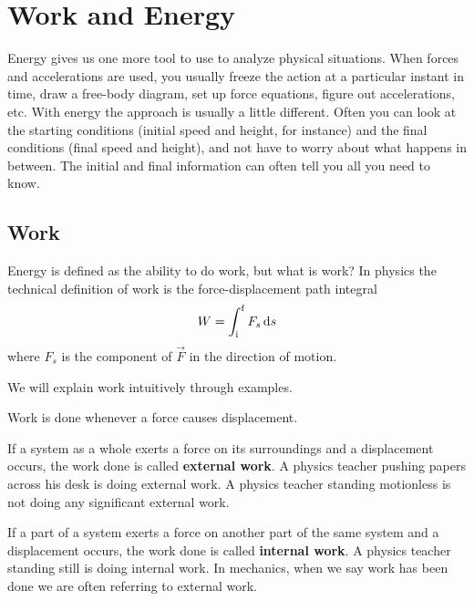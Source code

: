 \section{Work and Energy}

Energy gives us one more tool to use to analyze physical situations.
When forces and accelerations are used, you usually freeze the action at
a particular instant in time, draw a free-body diagram, set up force
equations, figure out accelerations, etc.  With energy the approach is
usually a little different.  Often you can look at the starting
conditions (initial speed and height, for instance) and the final
conditions (final speed and height), and not have to worry about what
happens in between.  The initial and final information can often tell
you all you need to know.

\subsection{Work}

Energy is defined as the ability to do work, but what is work?  In
physics the technical definition of work is the force-displacement path
integral
\begin{equation}
    W=\int_\ini^\fin F_s \dif s
\end{equation}
where
$
    F_s
$ is the component of
$
    \vec{F}
$ in the direction of motion.

We will explain work intuitively through examples.
\begin{remark}
    Work is done whenever a force causes displacement.
\end{remark}
If a system as a whole exerts a force on its surroundings and a
displacement occurs, the work done is called \textbf{external work}.  A
physics teacher pushing papers across his desk is doing external work.
A physics teacher standing motionless is not doing any significant
external work.

If a part of a system exerts a force on another part of the same system
and a displacement occurs, the work done is called \textbf{internal work}.
A physics teacher standing still is doing internal work.  In mechanics,
when we say work has been done we are often referring to external work.

